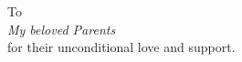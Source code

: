 \chapter*{} 


\begin{center}
{To\\[2em]
\Large \textit{My beloved Parents}}\\[1em]
for their unconditional love and support. 
\end{center}
